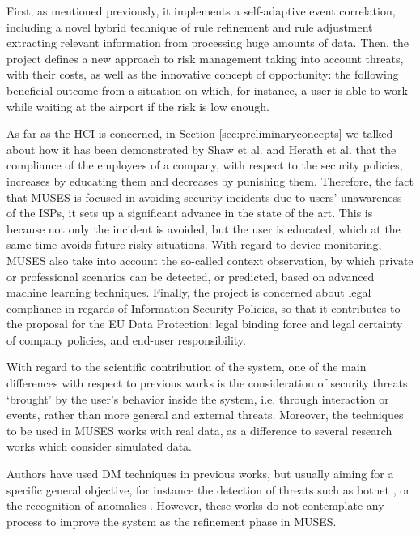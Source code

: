First, as mentioned previously, it  implements a self-adaptive event correlation, including a novel hybrid technique of rule refinement and rule adjustment extracting relevant information from processing huge amounts of data. Then, the project defines a new approach to risk management taking into account threats, with their costs, as well as the innovative concept of opportunity: the following beneficial outcome from a situation on which, for instance, a user is able to work while waiting at the airport if the risk is low enough. 

As far as the HCI is concerned, in Section \ref{sec:preliminaryconcepts} we talked about how it has been demonstrated by Shaw et al. \cite{SecPolComp09} and Herath et al. \cite{SecPolPenalty09} that the compliance of the employees of a company, with respect to the security policies, increases by educating them and decreases by punishing them. Therefore, the fact that MUSES is focused in avoiding security incidents due to users' unawareness of the ISPs, it sets up a significant advance in the state of the art. This is because not only the incident is avoided, but the user is educated, which at the same time avoids future risky situations.
With regard to device monitoring, MUSES  also take into account the so-called context observation, by which private or professional scenarios can be detected, or predicted, based on advanced machine learning techniques. Finally, the project is concerned about legal compliance in regards of Information Security Policies, so that it  contributes to the proposal for the EU Data Protection: legal binding force and legal certainty of company policies, and end-user responsibility.

With regard to the scientific contribution of the system, one of the main differences with respect to previous works is the consideration of security threats `brought' by the user's behavior inside the system, i.e. through interaction or events, rather than more general and external threats. Moreover, the techniques to be used in MUSES  works with real data, as a difference to several research works which consider simulated data.

Authors have used DM techniques in previous works, but usually aiming for a specific general objective, for instance the detection of threats such as botnet \cite{botnet_detection_clustering_09}, or the recognition of anomalies \cite{feature_selection_anomalies_08}. However, these works do not contemplate any process to improve the system as the refinement phase in MUSES.

